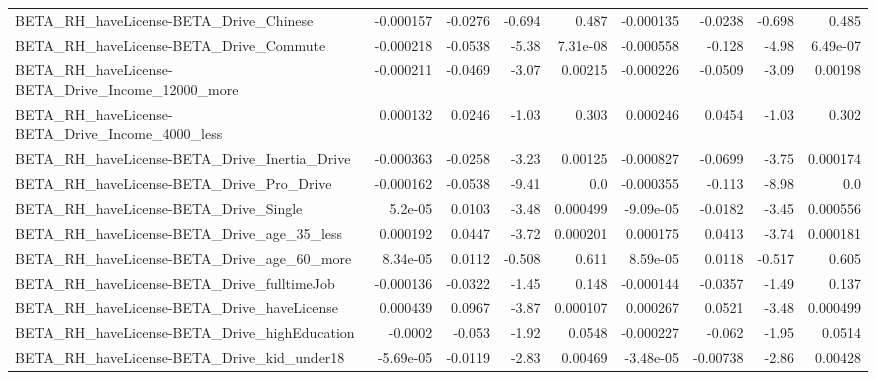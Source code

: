 \begin{tabular}{lrrrrrrrr}
BETA\_RH\_haveLicense-BETA\_Drive\_Chinese             &   -0.000157 &      -0.0276 &   -0.694 &    0.487 &  -0.000135 &     -0.0238 &       -0.698 &         0.485 \\
BETA\_RH\_haveLicense-BETA\_Drive\_Commute             &   -0.000218 &      -0.0538 &    -5.38 & 7.31e-08 &  -0.000558 &      -0.128 &        -4.98 &      6.49e-07 \\
BETA\_RH\_haveLicense-BETA\_Drive\_Income\_12000\_more   &   -0.000211 &      -0.0469 &    -3.07 &  0.00215 &  -0.000226 &     -0.0509 &        -3.09 &       0.00198 \\
BETA\_RH\_haveLicense-BETA\_Drive\_Income\_4000\_less    &    0.000132 &       0.0246 &    -1.03 &    0.303 &   0.000246 &      0.0454 &        -1.03 &         0.302 \\
BETA\_RH\_haveLicense-BETA\_Drive\_Inertia\_Drive       &   -0.000363 &      -0.0258 &    -3.23 &  0.00125 &  -0.000827 &     -0.0699 &        -3.75 &      0.000174 \\
BETA\_RH\_haveLicense-BETA\_Drive\_Pro\_Drive           &   -0.000162 &      -0.0538 &    -9.41 &      0.0 &  -0.000355 &      -0.113 &        -8.98 &           0.0 \\
BETA\_RH\_haveLicense-BETA\_Drive\_Single              &     5.2e-05 &       0.0103 &    -3.48 & 0.000499 &  -9.09e-05 &     -0.0182 &        -3.45 &      0.000556 \\
BETA\_RH\_haveLicense-BETA\_Drive\_age\_35\_less         &    0.000192 &       0.0447 &    -3.72 & 0.000201 &   0.000175 &      0.0413 &        -3.74 &      0.000181 \\
BETA\_RH\_haveLicense-BETA\_Drive\_age\_60\_more         &    8.34e-05 &       0.0112 &   -0.508 &    0.611 &   8.59e-05 &      0.0118 &       -0.517 &         0.605 \\
BETA\_RH\_haveLicense-BETA\_Drive\_fulltimeJob         &   -0.000136 &      -0.0322 &    -1.45 &    0.148 &  -0.000144 &     -0.0357 &        -1.49 &         0.137 \\
BETA\_RH\_haveLicense-BETA\_Drive\_haveLicense         &    0.000439 &       0.0967 &    -3.87 & 0.000107 &   0.000267 &      0.0521 &        -3.48 &      0.000499 \\
BETA\_RH\_haveLicense-BETA\_Drive\_highEducation       &     -0.0002 &       -0.053 &    -1.92 &   0.0548 &  -0.000227 &      -0.062 &        -1.95 &        0.0514 \\
BETA\_RH\_haveLicense-BETA\_Drive\_kid\_under18         &   -5.69e-05 &      -0.0119 &    -2.83 &  0.00469 &  -3.48e-05 &    -0.00738 &        -2.86 &       0.00428 \\

\end{tabular}
